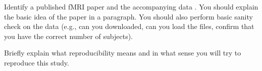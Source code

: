 
Identify a published fMRI paper and the accompanying data
\cite{lindquist2008statistical}.  You should explain the basic idea of the
paper in a paragraph.  You should also perform basic sanity check on the data
(e.g., can you downloaded, can you load the files, confirm that you have the
correct number of subjects).

Briefly explain what reproducibility means and in what sense you will
try to reproduce this study.
